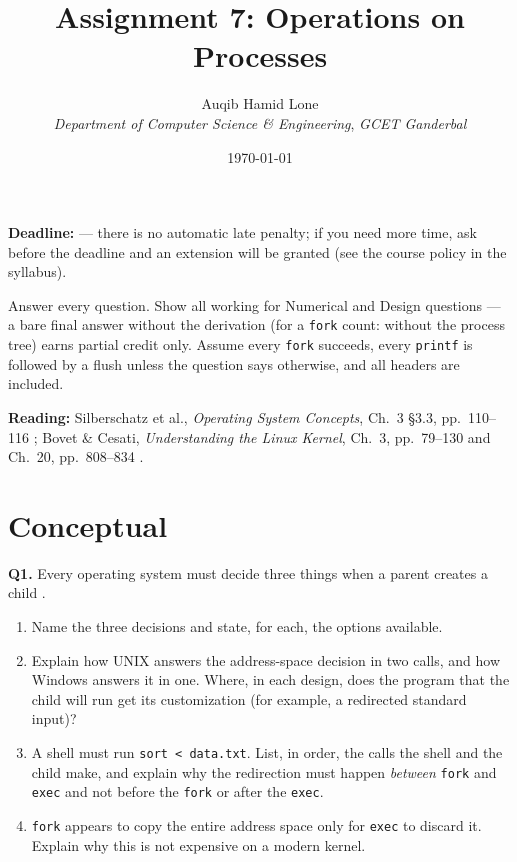 \documentclass[11pt]{article}
\title{Assignment 7: Operations on Processes}
\author{Auqib Hamid Lone\\[0.3em]
  \emph{Department of Computer Science \& Engineering}, \emph{GCET Ganderbal}}
\date{\today}
\begin{document}
\maketitle

\noindent\textbf{Deadline:}  --- there is no automatic late penalty; if you need more time, ask before the deadline and an extension will be granted (see the course policy in the syllabus).

\noindent Answer every question. Show all working for Numerical and Design questions --- a bare final answer without the derivation (for a \texttt{fork} count: without the process tree) earns partial credit only. Assume every \texttt{fork} succeeds, every \texttt{printf} is followed by a flush unless the question says otherwise, and all headers are included.

\noindent\textbf{Reading:} Silberschatz et al., \emph{Operating System Concepts}, Ch.~3 \S3.3, pp.~110--116 \cite{SilberschatzOSC_operating_system_concepts}; Bovet \& Cesati, \emph{Understanding the Linux Kernel}, Ch.~3, pp.~79--130 and Ch.~20, pp.~808--834 \cite{BovetCesati_understanding_linux_kernel}.

\section{Conceptual}

\textbf{Q1.} Every operating system must decide three things when a parent creates a child \cite{SilberschatzOSC_operating_system_concepts}.
\begin{enumerate}
  \item[(a)] Name the three decisions and state, for each, the options available.
  \item[(b)] Explain how UNIX answers the address-space decision in two calls, and how Windows answers it in one. Where, in each design, does the program that the child will run get its customization (for example, a redirected standard input)?
  \item[(c)] A shell must run \texttt{sort < data.txt}. List, in order, the calls the shell and the child make, and explain why the redirection must happen \emph{between} \texttt{fork} and \texttt{exec} and not before the \texttt{fork} or after the \texttt{exec}.
  \item[(d)] \texttt{fork} appears to copy the entire address space only for \texttt{exec} to discard it. Explain why this is not expensive on a modern kernel.
\end{enumerate}
\end{document}
